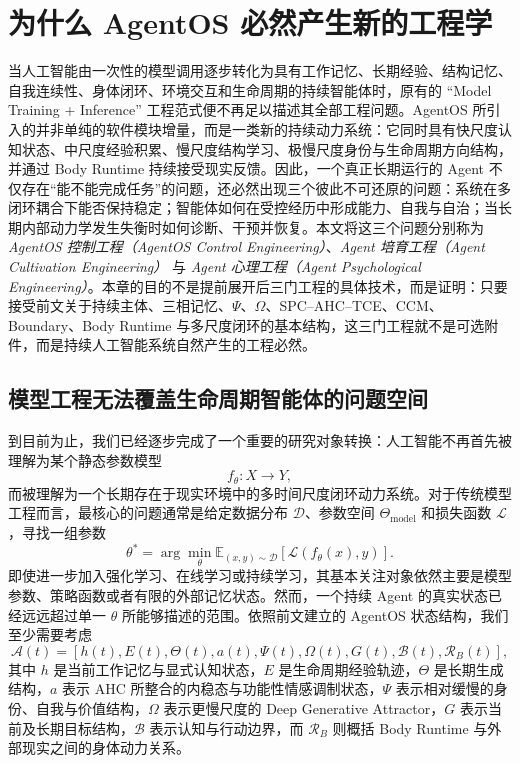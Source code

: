 \chapter{为什么 AgentOS 必然产生新的工程学}

\begin{chapterlead}
当人工智能由一次性的模型调用逐步转化为具有工作记忆、长期经验、结构记忆、自我连续性、身体闭环、环境交互和生命周期的持续智能体时，原有的 ``Model Training + Inference'' 工程范式便不再足以描述其全部工程问题。AgentOS 所引入的并非单纯的软件模块增量，而是一类新的持续动力系统：它同时具有快尺度认知状态、中尺度经验积累、慢尺度结构学习、极慢尺度身份与生命周期方向结构，并通过 Body Runtime 持续接受现实反馈。因此，一个真正长期运行的 Agent 不仅存在``能不能完成任务''的问题，还必然出现三个彼此不可还原的问题：系统在多闭环耦合下能否保持稳定；智能体如何在受控经历中形成能力、自我与自治；当长期内部动力学发生失衡时如何诊断、干预并恢复。本文将这三个问题分别称为 \emph{AgentOS 控制工程（AgentOS Control Engineering）}、\emph{Agent 培育工程（Agent Cultivation Engineering）} 与 \emph{Agent 心理工程（Agent Psychological Engineering）}。本章的目的不是提前展开后三门工程的具体技术，而是证明：只要接受前文关于持续主体、三相记忆、$\Psi$、$\Omega$、SPC--AHC--TCE、CCM、Boundary、Body Runtime 与多尺度闭环的基本结构，这三门工程就不是可选附件，而是持续人工智能系统自然产生的工程必然。
\end{chapterlead}

\section{模型工程无法覆盖生命周期智能体的问题空间}

到目前为止，我们已经逐步完成了一个重要的研究对象转换：人工智能不再首先被理解为某个静态参数模型
\[
f_{\theta}:X\rightarrow Y,
\]
而被理解为一个长期存在于现实环境中的多时间尺度闭环动力系统。对于传统模型工程而言，最核心的问题通常是给定数据分布 $\mathcal{D}$、参数空间 $\Theta_{\mathrm{model}}$ 和损失函数 $\mathcal{L}$，寻找一组参数
\[
\theta^{*}
=
\arg\min_{\theta}
\mathbb{E}_{(x,y)\sim\mathcal D}
\left[
\mathcal L(f_{\theta}(x),y)
\right].
\]
即使进一步加入强化学习、在线学习或持续学习，其基本关注对象依然主要是模型参数、策略函数或者有限的外部记忆状态。然而，一个持续 Agent 的真实状态已经远远超过单一 $\theta$ 所能够描述的范围。依照前文建立的 AgentOS 状态结构，我们至少需要考虑
\[
\mathcal{A}(t)
=
\left[
h(t),
E(t),
\Theta(t),
a(t),
\Psi(t),
\Omega(t),
G(t),
\mathcal{B}(t),
\mathcal{R}_{B}(t)
\right],
\]
其中 $h$ 是当前工作记忆与显式认知状态，$E$ 是生命周期经验轨迹，$\Theta$ 是长期生成结构，$a$ 表示 AHC 所整合的内稳态与功能性情感调制状态，$\Psi$ 表示相对缓慢的身份、自我与价值结构，$\Omega$ 表示更慢尺度的 Deep Generative Attractor，$G$ 表示当前及长期目标结构，$\mathcal{B}$ 表示认知与行动边界，而 $\mathcal{R}_{B}$ 则概括 Body Runtime 与外部现实之间的身体动力关系。

